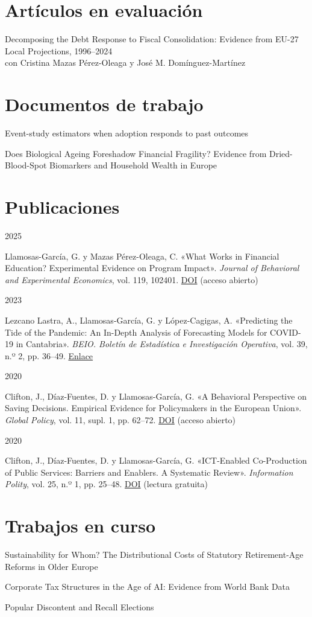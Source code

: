 \documentclass[11pt,a4paper]{article}
\newcommand{\entry}[2]{\begin{minipage}[t]{2.6cm}\sffamily\small\textcolor{muted}{#1}\end{minipage}%
  \begin{minipage}[t]{\linewidth-2.6cm}\raggedright #2\end{minipage}\par\vspace{4pt}}
\begin{document}
\section{Artículos en evaluación}
\entry{}{Decomposing the Debt Response to Fiscal Consolidation: Evidence from EU-27 Local Projections, 1996–2024\\{\small\color{muted}con Cristina Mazas Pérez-Oleaga y José M. Domínguez-Martínez}}

\section{Documentos de trabajo}
\entry{}{Event-study estimators when adoption responds to past outcomes}
\entry{}{Does Biological Ageing Foreshadow Financial Fragility? Evidence from Dried-Blood-Spot Biomarkers and Household Wealth in Europe}

\section{Publicaciones}
\entry{2025}{Llamosas-García, G. y Mazas Pérez-Oleaga, C. «What Works in Financial Education? Experimental Evidence on Program Impact». \emph{Journal of Behavioral and Experimental Economics}, vol. 119, 102401. \href{https://doi.org/10.1016/j.socec.2025.102401}{\color{accent}DOI} (acceso abierto)}
\entry{2023}{Lezcano Lastra, A., Llamosas-García, G. y López-Cagigas, A. «Predicting the Tide of the Pandemic: An In-Depth Analysis of Forecasting Models for COVID-19 in Cantabria». \emph{BEIO. Boletín de Estadística e Investigación Operativa}, vol. 39, n.º 2, pp. 36–49. \href{https://portaldelainvestigacion.uma.es/documentos/6501a724df0d06753d5bfb47}{\color{accent}Enlace}}
\entry{2020}{Clifton, J., Díaz-Fuentes, D. y Llamosas-García, G. «A Behavioral Perspective on Saving Decisions. Empirical Evidence for Policymakers in the European Union». \emph{Global Policy}, vol. 11, supl. 1, pp. 62–72. \href{https://doi.org/10.1111/1758-5899.12751}{\color{accent}DOI} (acceso abierto)}
\entry{2020}{Clifton, J., Díaz-Fuentes, D. y Llamosas-García, G. «ICT-Enabled Co-Production of Public Services: Barriers and Enablers. A Systematic Review». \emph{Information Polity}, vol. 25, n.º 1, pp. 25–48. \href{https://doi.org/10.3233/IP-190122}{\color{accent}DOI} (lectura gratuita)}

\section{Trabajos en curso}
\entry{}{Sustainability for Whom? The Distributional Costs of Statutory Retirement-Age Reforms in Older Europe}
\entry{}{Corporate Tax Structures in the Age of AI: Evidence from World Bank Data}
\entry{}{Popular Discontent and Recall Elections}
\end{document}
